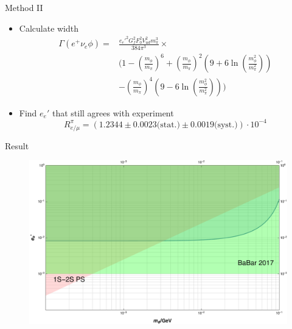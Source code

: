 \documentclass[11pt]{beamer}
\numberwithin{equation}{section}
\begin{document}
\begin{frame}{Method II}
\begin{itemize}
\item Calculate width
\begin{align*}
\Gamma(e^+\nu_e\phi) =& \frac{e_e'^2 G_f^2 F_0^2 V_{ud}^2 m_\pi^3}{384\pi^3}\times \\ &\Bigg(
1-\left(\frac{m_\phi}{m_\pi}\right)^6+\left(\frac{m_\phi}{m_\pi}\right)^2\left(9+6\ln\left(\frac{m_\phi^2}{m_\pi^2}\right)\right)\\&-\left(\frac{m_\phi}{m_\pi}\right)^4\left(9-6\ln\left(\frac{m_\phi^2}{m_\pi^2}\right)\right)
\Bigg)
\end{align*}
\pause
\item Find $e_e'$ that still agrees with experiment \cite{PhysRevLett.115.071801}
\pause
\begin{equation*}
R^\pi_{e/\mu} =(1.2344\pm 0.0023\text{(stat.)} \pm 0.0019\text{(syst.)})\cdot 10^{-4}
\end{equation*}
\end{itemize}
\end{frame}

\begin{frame}{Result}
\begin{figure}[H]
  \centering
    \includegraphics[width=\textwidth]{../imgs/LeptonUniversality}
\end{figure}
\end{frame}
\end{document}

